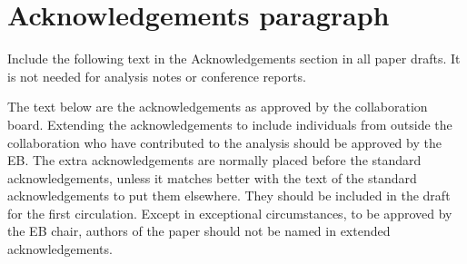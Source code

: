 \section{Acknowledgements paragraph}

Include the following text in the Acknowledgements section in all paper
drafts. It is not needed for analysis notes or conference reports.

The text below are the acknowledgements as approved by the collaboration
board. Extending the acknowledgements to include individuals from outside the
collaboration who have contributed to the analysis should be approved by the
EB. The extra acknowledgements are normally placed before the standard 
acknowledgements, unless it matches better with the text of the standard 
acknowledgements to put them elsewhere. They should be included in the draft 
for the first circulation. Except in exceptional circumstances, to be approved by the
EB chair, authors of the paper should not be named in extended acknowledgements.



